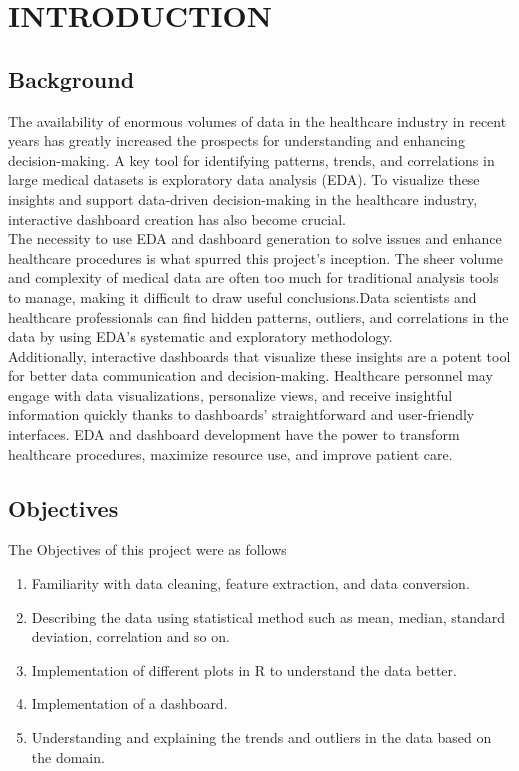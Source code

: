 
\chapter{INTRODUCTION}

\section{{\bf{Background}}}

The availability of enormous volumes of data in the healthcare industry in recent years has greatly increased the prospects for understanding and enhancing decision-making. A key tool for identifying patterns, trends, and correlations in large medical datasets is exploratory data analysis (EDA). To visualize these insights and support data-driven decision-making in the healthcare industry, interactive dashboard creation has also become crucial.\\
\noindent
The necessity to use EDA and dashboard generation to solve issues and enhance healthcare procedures is what spurred this project's inception. The sheer volume and complexity of medical data are often too much for traditional analysis tools to manage, making it difficult to draw useful conclusions.Data scientists and healthcare professionals can find hidden patterns, outliers, and correlations in the data by using EDA's systematic and exploratory methodology.\\
\noindent
Additionally, interactive dashboards that visualize these insights are a potent tool for better data communication and decision-making. Healthcare personnel may engage with data visualizations, personalize views, and receive insightful information quickly thanks to dashboards' straightforward and user-friendly interfaces. EDA and dashboard development have the power to transform healthcare procedures, maximize resource use, and improve patient care.


\section{{\bf{Objectives}}}
{The Objectives of this project were as follows
\begin{enumerate}
 \item Familiarity with data cleaning, feature extraction, and data conversion. 
 \item Describing the data using statistical method such as mean, median, standard deviation, correlation and so on. 
 \item Implementation of different plots in R to understand the data better. 
 \item Implementation of a dashboard.
 \item Understanding and explaining the trends and outliers in the data based on the domain.
\end{enumerate}
}

